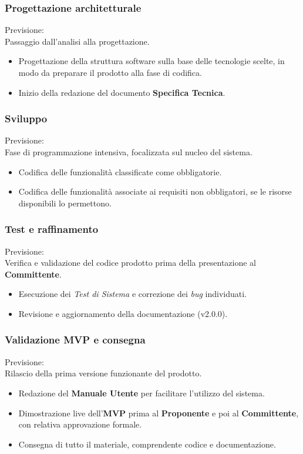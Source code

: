 \documentclass[12pt, a4paper]{article}
\begin{document}
{\subsubsection{Progettazione architetturale}
Previsione: \\
Passaggio dall'analisi alla progettazione.
\begin{itemize}
    \item Progettazione della struttura software sulla base delle tecnologie scelte, in modo da preparare il prodotto alla fase di codifica.

    \item Inizio della redazione del documento \textbf{Specifica Tecnica}.
\end{itemize}


\subsubsection{Sviluppo}
Previsione: \\
Fase di programmazione intensiva, focalizzata sul nucleo del sistema.
\begin{itemize}
    \item Codifica delle funzionalità classificate come obbligatorie.
    \item Codifica delle funzionalità associate ai requisiti non obbligatori, se le risorse disponibili lo permettono.
\end{itemize}

\subsubsection{Test e raffinamento}
Previsione: \\
Verifica e validazione del codice prodotto prima della presentazione al \textbf{Committente}.
\begin{itemize}
    \item Esecuzione dei \textit{Test di Sistema} e correzione dei \textit{bug} individuati.
    \item Revisione e aggiornamento della documentazione (v2.0.0).
\end{itemize}

\subsubsection{Validazione \textbf{MVP} e consegna}
Previsione: \\
Rilascio della prima versione funzionante del prodotto.
\begin{itemize}
    \item Redazione del \textbf{Manuale Utente} per facilitare l'utilizzo del sistema.
    \item Dimostrazione live dell'\textbf{MVP} prima al \textbf{Proponente} e poi al \textbf{Committente}, con relativa approvazione formale.
    \item Consegna di tutto il materiale, comprendente codice e documentazione.
\end{itemize}


}
\end{document}

